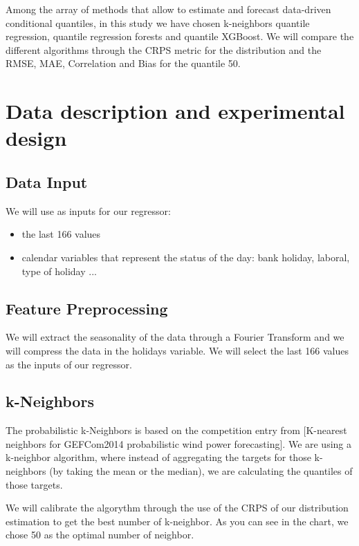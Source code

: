 \documentclass[a4paper,twocolumn,5p]{elsarticle}
\begin{document}
Among the array of methods that allow to estimate and forecast
data-driven conditional quantiles, in this study we have chosen
k-neighbors quantile regression, quantile regression forests and quantile XGBoost. 
We will compare the different algorithms through the CRPS metric for the 
distribution and the RMSE, MAE, Correlation and Bias for the quantile 50.

\section{Data description and experimental design}

\subsection{Data Input}

We will use as inputs for our regressor:
\begin{itemize}
  \item the last 166 values
  \item calendar variables that represent the status of the day: bank holiday, laboral, type of holiday ...
\end{itemize}

\subsection{Feature Preprocessing}

We will extract the seasonality of the data through a Fourier Transform and we will compress the 
data in the holidays variable. We will select the last 166 values as the inputs of our regressor.

\subsection{k-Neighbors}

The probabilistic k-Neighbors is based on the competition entry from 
[K-nearest neighbors for GEFCom2014 probabilistic wind power forecasting]. 
We are using a k-neighbor algorithm, where instead of aggregating the targets for those k-neighbors 
(by taking the mean or the median), we are calculating the quantiles of those targets.

We will calibrate the algorythm through the use of the CRPS of our distribution estimation 
to get the best number of k-neighbor. As you can see in the chart, we chose 50 as the optimal 
number of neighbor.
\end{document}
